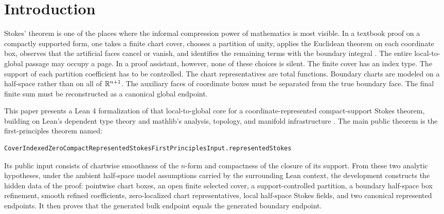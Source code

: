 \section{Introduction}
\label{sec:introduction}

Stokes' theorem is one of the places where the informal compression power of
mathematics is most visible.  In a textbook proof on a compactly supported
form, one takes a finite chart cover, chooses a partition of unity, applies the
Euclidean theorem on each coordinate box, observes that the artificial faces
cancel or vanish, and identifies the remaining terms with the boundary
integral \cite{spivak1965calculus,munkres1991analysis,lee2013smooth,tu2011introduction}.
The entire local-to-global passage may occupy a page.  In a proof
assistant, however, none of these choices is silent.  The finite cover has an
index type.  The support of each partition coefficient has to be controlled.
The chart representatives are total functions.  Boundary charts are modeled on
a half-space rather than on all of \(\mathbb{R}^{n+1}\).  The auxiliary faces of
coordinate boxes must be separated from the true boundary face.  The final
finite sum must be reconstructed as a canonical global endpoint.

This paper presents a Lean 4 formalization of that local-to-global core for a
coordinate-represented compact-support Stokes theorem, building on Lean's
dependent type theory and mathlib's analysis, topology, and manifold
infrastructure \cite{demoura2015lean,demoura2021lean4,leanprover,tpil4,mathlib2020,mathlibdocs}.
The main public theorem is the first-principles theorem named:
\begin{lstlisting}[language=Lean]
CoverIndexedZeroCompactRepresentedStokesFirstPrinciplesInput.representedStokes
\end{lstlisting}
Its public input consists of chartwise smoothness of the \(n\)-form and
compactness of the closure of its support.  From these two analytic hypotheses,
under the ambient half-space model assumptions carried by the surrounding Lean
context, the development constructs the hidden data of the proof: pointwise
chart boxes, an open finite selected cover, a support-controlled partition, a
boundary half-space box refinement, smooth refined coefficients,
zero-localized chart representatives, local half-space Stokes fields, and two
canonical represented endpoints.  It then proves that the generated bulk
endpoint equals the generated boundary endpoint.

